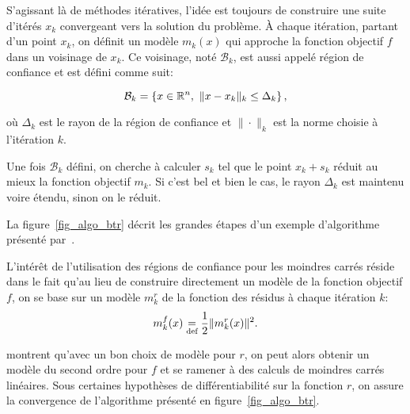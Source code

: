 S'agissant là de méthodes itératives, l'idée est toujours de construire une suite d'itérés $x_k$ convergeant vers la solution du problème. \`A chaque itération, 
partant d'un point $x_k$, on définit un modèle $m_k(x)$ qui approche la fonction objectif $f$ dans un voisinage de $x_k$. Ce voisinage, noté $\mathcal{B}_k$, 
est aussi appelé région de confiance et est défini comme suit:

\begin{equation}\label{trust_region_def}
    \mathcal{B}_k=\left\{ x \in \real^n,\ \|x-x_k\|_k\leq\Delta_k\right\},
\end{equation}

où $\Delta_k$ est le rayon de la région de confiance et $\|\cdot\|_k$ est la norme choisie à l'itération $k$.

Une fois $\mathcal{B}_k$ défini, on cherche à calculer $s_k$ tel que le point $x_k+s_k$ réduit au mieux la fonction objectif $m_k$. Si c'est bel et bien le cas, 
le rayon $\Delta_k$ est maintenu voire étendu, sinon on le réduit. 

La figure~\ref{fig_algo_btr} décrit les grandes étapes d'un exemple d'algorithme présenté par~\citet{conngoultoin00}.


L'intérêt de l'utilisation des régions de confiance pour les moindres carrés réside dans le fait qu'au lieu de construire directement un modèle de la 
fonction objectif $f$, on se base sur un modèle $m_k^r$ de la fonction des résidus à chaque itération $k$:
\[
m_k^f(x) \underset{\textnormal{def}}{=} \dfrac{1}{2}\|m_k^r(x)\|^2.
\]

\citet{conngoultoin00} montrent qu'avec un bon choix de modèle pour $r$, on peut alors obtenir un modèle du second ordre pour $f$ et se ramener à des calculs de 
moindres carrés linéaires. Sous certaines hypothèses de différentiabilité sur la fonction $r$, on assure la convergence de l'algorithme présenté en 
figure~\ref{fig_algo_btr}.

